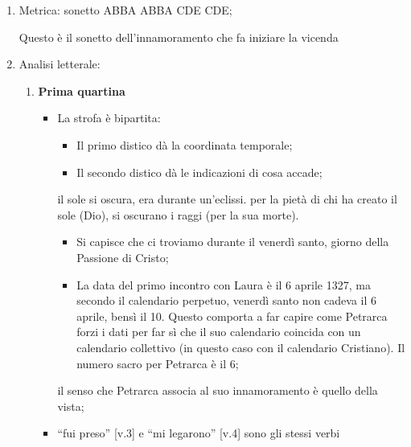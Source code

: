 \documentclass{article}
\begin{document}
\begin{enumerate}
    \item Metrica: sonetto ABBA ABBA CDE CDE;
    
    Questo è il sonetto dell'innamoramento che fa iniziare la vicenda

    \item Analisi letterale:
        \begin{enumerate}[label=]
            \item \textbf{Prima quartina}
                \begin{itemize}[label=]
                    \item La strofa è bipartita:
                        \begin{itemize}
                            \item Il primo distico dà la coordinata temporale;
                            \item Il secondo distico dà le indicazioni di cosa accade;
                        \end{itemize}
                     il sole si oscura,
                        era durante un'eclissi.
                     per la pietà di chi ha
                        creato il sole (Dio), si oscurano i raggi (per la sua morte).
                        \begin{itemize}
                            \item Si capisce che ci troviamo durante il venerdì santo, giorno
                                della Passione di Cristo;
                            \item La data del primo incontro con Laura è il 6 aprile 1327, ma secondo
                                il calendario perpetuo, venerdì santo non cadeva il 6 aprile, bensì
                                il 10. Questo comporta a far capire come Petrarca forzi i dati per far
                                sì che il suo calendario coincida con un calendario collettivo (in 
                                questo caso con il calendario Cristiano). Il numero sacro per Petrarca
                                è il 6;
                        \end{itemize}
                     il senso che 
                        Petrarca associa al suo innamoramento è quello della vista;
                    \item ``fui preso'' [v.3] e ``mi legarono'' [v.4] sono gli stessi verbi

\end{itemize}
\end{enumerate}
\end{enumerate}
\end{document}
